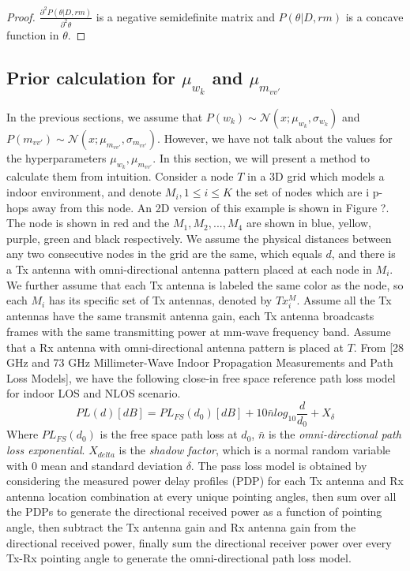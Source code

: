 \documentclass[conference]{IEEEtran}
\begin{document}
\begin{proof}
$\frac{\partial^{2} P(\theta|D,rm)}{\partial^{2} \theta}$ is a negative semidefinite matrix and $P(\theta|D,rm)$ is a concave function in $\theta$.
\end{proof}
\subsection{Prior calculation for $\mu_{w_{k}}$ and $\mu_{m_{vv'}}$ }
In the previous sections, we assume that $P(w_{k})\sim \mathcal{N}(x;\mu_{w_{k}},\sigma_{w_{k}})$ and  $P(m_{vv'})\sim \mathcal{N}(x;\mu_{m_{vv'}},\sigma_{m_{vv'}})$. However, we have not talk about the values for the hyperparameters $\mu_{w_{k}},\mu_{m_{vv'}}$. In this section, we will present a method to calculate them from intuition. 
Consider a node $T$ in a 3D grid which models a indoor environment, and denote $M_{i},1\leq i\leq K$  the set of nodes which are i p-hops away from this node. An 2D version of this example is shown in Figure ?. The node is shown in red and the $M_{1},M_{2},...,M_{4}$ are shown in blue, yellow, purple, green and black respectively. We assume the physical distances between any two consecutive nodes in the grid are the same, which equals $d$, and there is a Tx antenna with omni-directional antenna pattern placed at each node in $M_{i}$. We further assume that each Tx antenna is labeled the same color as the node, so each $M_{i}$ has its specific set of Tx antennas, denoted by $Tx_{i}^{M}$. Assume all the Tx antennas have the same transmit antenna gain, each Tx antenna broadcasts frames with the same transmitting power at mm-wave frequency band. Assume that a Rx antenna with omni-directional antenna pattern is placed at $T$. From [28 GHz and 73 GHz Millimeter-Wave Indoor Propagation Measurements and Path Loss Models], we have the following close-in free space reference path loss model for indoor LOS and NLOS scenario.
\begin{equation}
    PL(d)[dB] = PL_{FS}(d_{0})[dB]+10\bar{n}log_{10}\frac{d}{d_{0}}+X_{\delta}
\end{equation}
Where $PL_{FS}(d_{0})$ is the free space path loss at $d_{0}$, $\bar{n}$ is the \emph{omni-directional path loss exponential}. $X_{delta}$ is the \emph{shadow factor}, which is a normal random variable with 0 mean and standard deviation $\delta$. The pass loss model is obtained by considering the measured power delay profiles (PDP) for each Tx antenna and Rx antenna location combination at every unique pointing angles, then sum over all the PDPs to generate the directional received power as a function of pointing angle, then subtract the Tx antenna gain and Rx antenna gain from the directional received power, finally sum the directional receiver power over every Tx-Rx pointing angle to generate the omni-directional path loss model.
\end{document}
